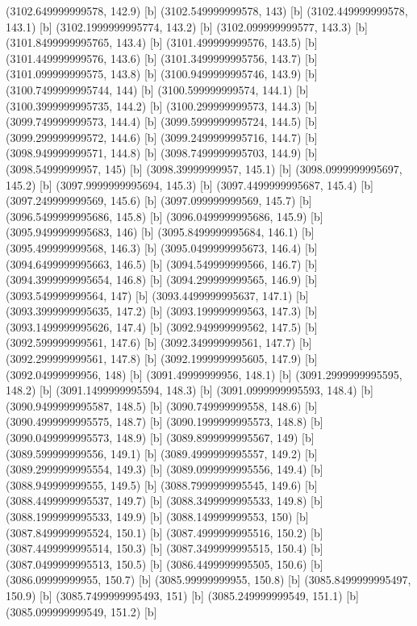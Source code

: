 {{{(3102.649999999578, 142.9) [b] 
(3102.549999999578, 143) [b] 
(3102.449999999578, 143.1) [b] 
(3102.1999999995774, 143.2) [b] 
(3102.099999999577, 143.3) [b] 
(3101.8499999995765, 143.4) [b] 
(3101.499999999576, 143.5) [b] 
(3101.449999999576, 143.6) [b] 
(3101.3499999995756, 143.7) [b] 
(3101.099999999575, 143.8) [b] 
(3100.9499999995746, 143.9) [b] 
(3100.7499999995744, 144) [b] 
(3100.599999999574, 144.1) [b] 
(3100.3999999995735, 144.2) [b] 
(3100.299999999573, 144.3) [b] 
(3099.749999999573, 144.4) [b] 
(3099.5999999995724, 144.5) [b] 
(3099.299999999572, 144.6) [b] 
(3099.2499999995716, 144.7) [b] 
(3098.949999999571, 144.8) [b] 
(3098.7499999995703, 144.9) [b] 
(3098.54999999957, 145) [b] 
(3098.39999999957, 145.1) [b] 
(3098.0999999995697, 145.2) [b] 
(3097.9999999995694, 145.3) [b] 
(3097.4499999995687, 145.4) [b] 
(3097.249999999569, 145.6) [b] 
(3097.099999999569, 145.7) [b] 
(3096.5499999995686, 145.8) [b] 
(3096.0499999995686, 145.9) [b] 
(3095.9499999995683, 146) [b] 
(3095.8499999995684, 146.1) [b] 
(3095.499999999568, 146.3) [b] 
(3095.0499999995673, 146.4) [b] 
(3094.6499999995663, 146.5) [b] 
(3094.549999999566, 146.7) [b] 
(3094.3999999995654, 146.8) [b] 
(3094.299999999565, 146.9) [b] 
(3093.549999999564, 147) [b] 
(3093.4499999995637, 147.1) [b] 
(3093.3999999995635, 147.2) [b] 
(3093.199999999563, 147.3) [b] 
(3093.1499999995626, 147.4) [b] 
(3092.949999999562, 147.5) [b] 
(3092.599999999561, 147.6) [b] 
(3092.349999999561, 147.7) [b] 
(3092.299999999561, 147.8) [b] 
(3092.1999999995605, 147.9) [b] 
(3092.04999999956, 148) [b] 
(3091.49999999956, 148.1) [b] 
(3091.2999999995595, 148.2) [b] 
(3091.1499999995594, 148.3) [b] 
(3091.0999999995593, 148.4) [b] 
(3090.9499999995587, 148.5) [b] 
(3090.749999999558, 148.6) [b] 
(3090.4999999995575, 148.7) [b] 
(3090.1999999995573, 148.8) [b] 
(3090.0499999995573, 148.9) [b] 
(3089.8999999995567, 149) [b] 
(3089.599999999556, 149.1) [b] 
(3089.4999999995557, 149.2) [b] 
(3089.2999999995554, 149.3) [b] 
(3089.0999999995556, 149.4) [b] 
(3088.949999999555, 149.5) [b] 
(3088.7999999995545, 149.6) [b] 
(3088.4499999995537, 149.7) [b] 
(3088.3499999995533, 149.8) [b] 
(3088.1999999995533, 149.9) [b] 
(3088.149999999553, 150) [b] 
(3087.8499999995524, 150.1) [b] 
(3087.4999999995516, 150.2) [b] 
(3087.4499999995514, 150.3) [b] 
(3087.3499999995515, 150.4) [b] 
(3087.0499999995513, 150.5) [b] 
(3086.4499999995505, 150.6) [b] 
(3086.09999999955, 150.7) [b] 
(3085.99999999955, 150.8) [b] 
(3085.8499999995497, 150.9) [b] 
(3085.7499999995493, 151) [b] 
(3085.249999999549, 151.1) [b] 
(3085.099999999549, 151.2) [b] 
}}}
